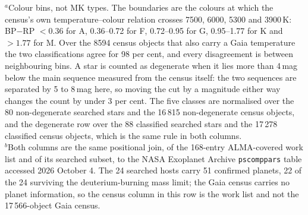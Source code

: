\begin{table}
\smallskip
{\footnotesize $^{a}$Colour bins, not MK types. The boundaries are the colours at which the census's own temperature--colour relation crosses 7500, 6000, 5300 and 3900\,K: BP$-$RP $<0.36$ for A, 0.36--0.72 for F, 0.72--0.95 for G, 0.95--1.77 for K and $>1.77$ for M. Over the 8594 census objects that also carry a Gaia temperature the two classifications agree for 98 per cent, and every disagreement is between neighbouring bins. A star is counted as degenerate when it lies more than 4\,mag below the main sequence measured from the census itself: the two sequences are separated by 5 to 8\,mag here, so moving the cut by a magnitude either way changes the count by under 3 per cent. The five classes are normalised over the 80 non-degenerate searched stars and the 16\,815 non-degenerate census objects, and the degenerate row over the 88 classified searched stars and the 17\,278 classified census objects, which is the same rule in both columns.\\ $^{b}$Both columns are the same positional join, of the 168-entry ALMA-covered work list and of its searched subset, to the NASA Exoplanet Archive \texttt{pscomppars} table accessed 2026 October 4. The 24 searched hosts carry 51 confirmed planets, 22 of the 24 surviving the deuterium-burning mass limit; the Gaia census carries no planet information, so the census column in this row is the work list and not the 17\,566-object Gaia census.}
\end{table}
